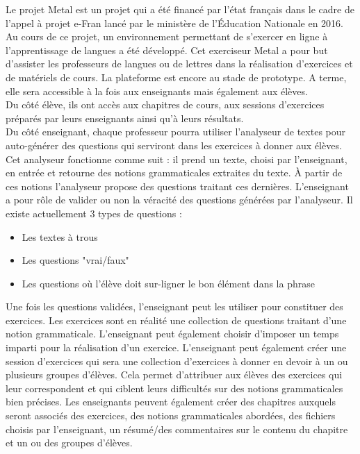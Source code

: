 \documentclass[12pt]{article}
\begin{document}
Le projet Metal est un projet qui a été financé par l'état français dans le cadre de l'appel à projet e-Fran lancé par le ministère de l'Éducation Nationale en 2016. Au cours de ce projet, un environnement permettant de s'exercer en ligne à l'apprentissage de langues a été développé. Cet exerciseur Metal a pour but d'assister les professeurs de langues ou de lettres dans la réalisation d'exercices et de matériels de cours. La plateforme est encore au stade de prototype. A terme, elle sera accessible à la fois aux enseignants mais également aux élèves. \\
Du côté élève, ils ont accès aux chapitres de cours, aux sessions d'exercices préparés par leurs enseignants ainsi qu'à leurs résultats. \\
Du côté enseignant, chaque professeur pourra utiliser l'analyseur de textes pour auto-générer des questions qui serviront dans les exercices à donner aux élèves. Cet analyseur fonctionne comme suit : il prend un texte, choisi par l'enseignant, en entrée et retourne des notions grammaticales extraites du texte. À partir de ces notions l'analyseur propose des questions traitant ces dernières. L'enseignant a pour rôle de valider ou non la véracité des questions générées par l'analyseur. Il existe actuellement 3 types de questions : 

\begin{itemize}
    \item Les textes à trous
    \item Les questions "vrai/faux"
    \item Les questions où l'élève doit sur-ligner le bon élément dans la phrase
\end{itemize}

 
Une fois les questions validées, l'enseignant peut les utiliser pour constituer des exercices. Les exercices sont en réalité une collection de questions traitant d'une notion grammaticale. L'enseignant peut également choisir d'imposer un temps imparti pour la réalisation d'un exercice.
L'enseignant peut également créer une session d'exercices qui sera une collection d'exercices à donner en devoir à un ou plusieurs groupes d'élèves. Cela permet d'attribuer aux élèves des exercices qui leur correspondent et qui ciblent leurs difficultés sur des notions grammaticales bien précises.
Les enseignants peuvent également créer des chapitres auxquels seront associés des exercices, des notions grammaticales abordées, des fichiers choisis par l'enseignant, un résumé/des commentaires sur le contenu du chapitre et un ou des groupes d'élèves.
\end{document}
